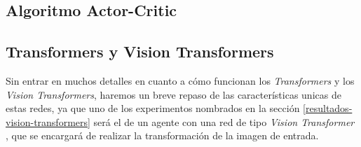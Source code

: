\subsection{Algoritmo Actor-Critic}
\label{algoritmo-actor-critic}

\subsection{Transformers y Vision Transformers}
\label{vision-transformers}

Sin entrar en muchos detalles en cuanto a cómo funcionan los \textit{Transformers} y los \textit{Vision Transformers}, haremos un breve repaso de las características unicas de estas redes, ya que uno de los experimentos nombrados en la sección \ref{resultados-vision-transformers} será el de un agente con una red de tipo \textit{Vision Transformer} \citep{visiontransformers}, que se encargará de realizar la transformación de la imagen de entrada.
\medskip

